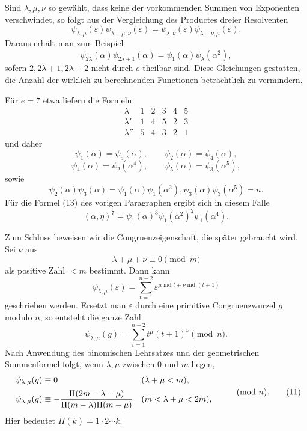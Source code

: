 \documentclass[11pt]{article}
\providecommand{\ind}{\operatorname{ind}}
\begin{document}
Sind $\lambda,
\mu,
\nu$ so gewählt, dass keine der vorkommenden Summen von Exponenten verschwindet, so folgt aus der Vergleichung des Productes dreier Resolventen
\[
        \psi_{\lambda,
\mu}(\varepsilon)
        \psi_{\lambda+
\mu,
\nu}(\varepsilon)
        =
        \psi_{\lambda,
\nu}(\varepsilon)
        \psi_{\lambda+
\nu,
\mu}(\varepsilon).                       \tag{5}
\]
Daraus erhält man zum Beispiel
\[
        \psi_{2\lambda}(\alpha)
        \psi_{2\lambda+1}(\alpha)=
        \psi_1(\alpha)
        \psi_\lambda(\alpha^2),                                      \tag{6}
\]
sofern $2,2\lambda+1,2\lambda+2$ nicht durch $e$ theilbar sind. Diese Gleichungen gestatten, die Anzahl der wirklich zu berechnenden Functionen beträchtlich zu vermindern.

Für $e=7$ etwa liefern die Formeln
\[
\begin{array}{c|rrrrr}
\lambda&1&2&3&4&5\\ \hline
\lambda'&1&4&5&2&3\\
\lambda''&5&4&3&2&1
\end{array}
\]
und daher
\[
\psi_1(\alpha)=\psi_5(\alpha),\qquad
\psi_2(\alpha)=\psi_4(\alpha),
\]
\[
\psi_4(\alpha)=\psi_2(\alpha^4),\qquad
\psi_5(\alpha)=\psi_3(\alpha^5),
\]
sowie
\[
        \psi_2(\alpha)
        \psi_3(\alpha)=\psi_1(\alpha)
        \psi_1(\alpha^2),
        \psi_3(\alpha)
        \psi_3(\alpha^5)=n.
\]
Für die Formel (13) des vorigen Paragraphen ergibt sich in diesem Falle
\[
        (\alpha,
\eta)^7=\psi_1(\alpha)^3
        \psi_1(\alpha^2)^2
        \psi_1(\alpha^4).                                             \tag{7}
\]

Zum Schluss beweisen wir die Congruenzeigenschaft, die später gebraucht wird. Sei $\nu$ aus
\[
        \lambda+
\mu+
\nu\equiv0\pmod m                                          \tag{8}
\]
als positive Zahl $<m$ bestimmt. Dann kann
\[
        \psi_{\lambda,
\mu}(\varepsilon)=
        \sum_{t=1}^{n-2}\varepsilon^{\mu\ind t+
\nu\ind(t+1)}          \tag{9}
\]
geschrieben werden. Ersetzt man $\varepsilon$ durch eine primitive Congruenzwurzel $g$ modulo $n$, so entsteht die ganze Zahl
\[
        \psi_{\lambda,
\mu}(g)=
        \sum_{t=1}^{n-2} t^\mu(t+1)^\nu \pmod n.                       \tag{10}
\]
Nach Anwendung des binomischen Lehrsatzes und der geometrischen Summenformel folgt, wenn $\lambda,
\mu$ zwischen $0$ und $m$ liegen,
\[
\begin{array}{ll}
\psi_{\lambda,
\mu}(g)
\equiv0 & (\lambda+
\mu<m),\\[0.5em]
\displaystyle
\psi_{\lambda,
\mu}(g)
\equiv-
{\Pi(2m-
\lambda-
\mu)\over
 \Pi(m-
\lambda)\Pi(m-
\mu)} & (m<\lambda+
\mu<2m),
\end{array}
\qquad\pmod n.                                                       \tag{11}
\]
Hier bedeutet $\Pi(k)=1\cdot2\cdots k$.
\end{document}
